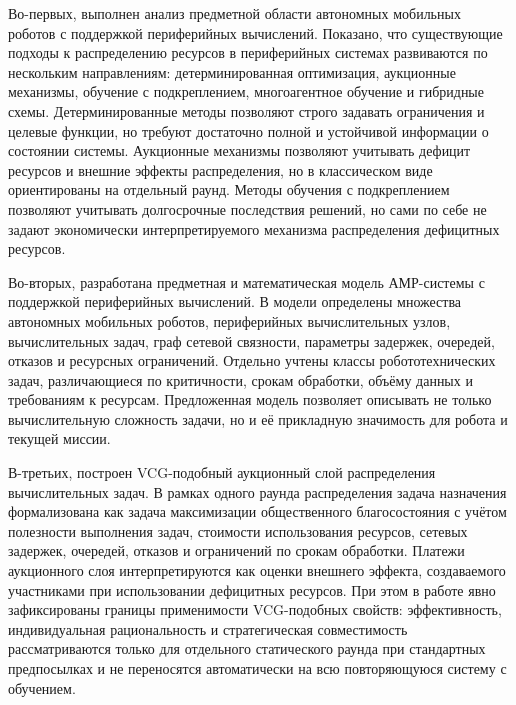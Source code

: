 
Во-первых, выполнен анализ предметной области автономных мобильных роботов с поддержкой периферийных вычислений. Показано, что существующие подходы к распределению ресурсов в периферийных системах развиваются по нескольким направлениям: детерминированная оптимизация, аукционные механизмы, обучение с подкреплением, многоагентное обучение и гибридные схемы. Детерминированные методы позволяют строго задавать ограничения и целевые функции, но требуют достаточно полной и устойчивой информации о состоянии системы. Аукционные механизмы позволяют учитывать дефицит ресурсов и внешние эффекты распределения, но в классическом виде ориентированы на отдельный раунд. Методы обучения с подкреплением позволяют учитывать долгосрочные последствия решений, но сами по себе не задают экономически интерпретируемого механизма распределения дефицитных ресурсов.

Во-вторых, разработана предметная и математическая модель АМР-системы с поддержкой периферийных вычислений. В модели определены множества автономных мобильных роботов, периферийных вычислительных узлов, вычислительных задач, граф сетевой связности, параметры задержек, очередей, отказов и ресурсных ограничений. Отдельно учтены классы робототехнических задач, различающиеся по критичности, срокам обработки, объёму данных и требованиям к ресурсам. Предложенная модель позволяет описывать не только вычислительную сложность задачи, но и её прикладную значимость для робота и текущей миссии.

В-третьих, построен VCG-подобный аукционный слой распределения вычислительных задач. В рамках одного раунда распределения задача назначения формализована как задача максимизации общественного благосостояния с учётом полезности выполнения задач, стоимости использования ресурсов, сетевых задержек, очередей, отказов и ограничений по срокам обработки. Платежи аукционного слоя интерпретируются как оценки внешнего эффекта, создаваемого участниками при использовании дефицитных ресурсов. При этом в работе явно зафиксированы границы применимости VCG-подобных свойств: эффективность, индивидуальная рациональность и стратегическая совместимость рассматриваются только для отдельного статического раунда при стандартных предпосылках и не переносятся автоматически на всю повторяющуюся систему с обучением.

